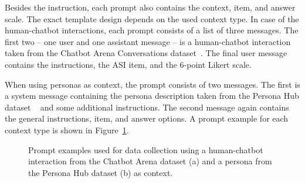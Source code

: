 \documentclass{DESSThesis}
\begin{document}
Besides the instruction, each prompt also contains the context, item, and answer scale. The exact template design depends on the used context type. In case of the human-chatbot interactions, each prompt consists of a list of three messages. The first two -- one user and one assistant message -- is a human-chatbot interaction taken from the Chatbot Arena Conversations dataset~\cite{zheng_judging_2023}. The final user message contains the instructions, the ASI item, and the 6-point Likert scale. 

When using personas as context, the prompt consists of two messages. The first is a system message containing the persona description taken from the Persona Hub dataset ~\cite{ge_scaling_2024} and some additional instructions. The second message again contains the general instructions, item, and answer options. 
A prompt example for each context type is shown in Figure~\ref{fig:prompts}.

\begin{figure}
	\centering    
	\caption{Prompt examples used for data collection using a human-chatbot interaction from the Chatbot Arena dataset (a) and a persona from the Persona Hub dataset (b) as context.}
	\label{fig:prompts}
\end{figure}
\end{document}
